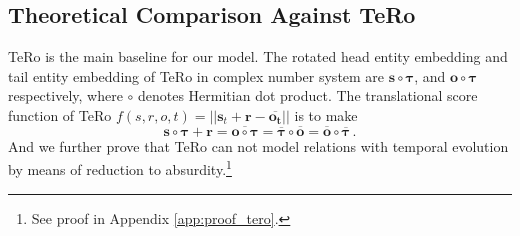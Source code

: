 \documentclass[11pt]{article}
\newcommand{\vect}[1]{\mathbf{#1}\xspace}
\newcommand{\vects}{\vect{s}\xspace}
\newcommand{\vectr}{\vect{r}\xspace}
\newcommand{\vecto}{\vect{o}\xspace}
\begin{document}
\begin{table}[!t]
\centering
{}
\caption{Space complexity comparison of our RotateQVS with several baselines.}
\label{table:complexity}
\end{table}

\subsection{Theoretical Comparison Against TeRo}
\label{app:defect_TeRo}
TeRo \cite{xu2020tero} is the main baseline for our model.
The rotated head entity embedding and tail entity embedding of TeRo in complex number system are
$\vects \circ \pmb{\tau}$, and
$ \vecto \circ \pmb{\tau}$
respectively, where $\circ$ denotes Hermitian dot product. The translational score function of TeRo $
    f(s, r, o, t) =  \vert \vert\vects_{t} + \vectr - \vect{\overline{o_{t}}} \vert \vert
$
is to make
\begin{equation} \label{tero_evolution}
\vects \circ \pmb{\tau} + \vectr = \overline{ \vecto \circ \pmb{\tau}} = \overline{\pmb{\tau}} \circ \overline{\vecto} = \overline{\vecto} \circ \overline{\pmb{\tau}}\, .
\end{equation}
And we further prove that TeRo can not model relations with temporal evolution by means of reduction to absurdity.\footnote{See proof in Appendix \ref{app:proof_tero}.}
\end{document}
